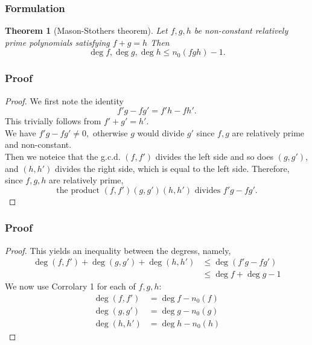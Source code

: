\documentclass[envcountsect]{beamer}
\newtheorem*{theorem*}{Theorem}
\begin{document}
\begin{frame}
\frametitle{Formulation}

\begin{theorem*}[Mason-Stothers theorem]
Let $f,g,h$ be non-constant relatively prime polynomials satisfying $f+g=h$
Then \[\operatorname{deg}f, \operatorname{deg}g, \operatorname{deg}h \leq
  n_0(fgh) -1.\]
\end{theorem*}

\end{frame}

\begin{frame}
  \frametitle{Proof}
  \begin{proof}\let\qed\relax
    We first note the identity
    \[
      f'g - fg' = f'h - fh'.
    \]
    This trivially follows from $f'+g' = h'.$ \\
    We have $f'g - fg' \neq 0,$
    otherwise $g$ would divide $g'$ since $f,g$ are relatively prime and non-constant. \\
    Then we noteice that the g.c.d. $(f, f')$ divides the left side and so does
    $(g,g')$, and $(h,h')$ divides the right side, which is equal to the left
    side. Therefore, since $f,g,h$ are relatively prime,
    $$
      \text{the product } (f,f')(g,g')(h,h') \text{ divides } f'g - fg'.
    $$

  \end{proof}
\end{frame}

\begin{frame}
  \frametitle{Proof}
  \begin{proof}\let\qed\relax
    This yields an inequality between the degress, namely,
    \begin{align} 
      \operatorname{deg}(f,f') + \operatorname{deg}(g,g') + \operatorname{deg}(h,h') &\leq
      \operatorname{deg}(f'g - fg') \label{ineq} \\ 
      &\leq \operatorname{deg}f + \operatorname{deg}g - 1 \nonumber
    \end{align}
    We now use Corrolary 1 for each of $f,g,h:$
    \begin{align*}
      \operatorname{deg}(f,f') &= \operatorname{deg}f - n_0(f) \\
      \operatorname{deg}(g,g') &= \operatorname{deg}g - n_0(g) \\
      \operatorname{deg}(h,h') &= \operatorname{deg}h - n_0(h)
    \end{align*}
    \end{proof}


\end{frame}
\end{document}
